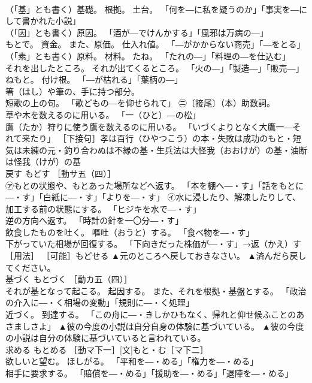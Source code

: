 \documentclass[8pt]{extreport}
\begin{document}
\begin{CJK}{UTF8}{min}
\\	（「基」とも書く）基礎。 根拠。 土台。 「何を―に私を疑うのか」「事実を―にして書かれた小説」 
\\	（「因」とも書く）原因。 「酒が―でけんかする」「風邪は万病の―」 
\\	もとで。 資金。 また、原価。 仕入れ値。 「―がかからない商売」「―をとる」 
\\	（「素」とも書く）原料。 材料。 たね。 「たれの―」「料理の―を仕込む」 
\\	それを出したところ。 それが出てくるところ。 「火の―」「製造―」「販売―」 
\\	ねもと。 付け根。 「―が枯れる」「葉柄の―」 
\\	箸（はし）や筆の、手に持つ部分。 
\\	短歌の上の句。 「歌どもの―を仰せられて」 ㊁〔接尾〕（本）助数詞。 
\\	草や木を数えるのに用いる。 「一（ひと）―の松」 
\\	鷹（たか）狩りに使う鷹を数えるのに用いる。 「いづくよりとなく大鷹一―それて来たり」 ［下接句］孝は百行（ひやつこう）の本・失敗は成功のもと・短気は未練の元・釣り合わぬは不縁の基・生兵法は大怪我（おおけが）の基・油断は怪我（けが）の基	
\\	戻す	もどす	［動サ五（四）］ 
\\	㋐もとの状態や、もとあった場所などへ返す。 「本を棚へ―・す」「話をもとに―・す」「白紙に―・す」「よりを―・す」 ㋑水に浸したり、解凍したりして、加工する前の状態にする。 「ヒジキを水で―・す」 
\\	逆の方向へ返す。 「時計の針を一〇分―・す」 
\\	飲食したものを吐く。 嘔吐（おうと）する。 「食べ物を―・す」 
\\	下がっていた相場が回復する。 「下向きだった株価が―・す」→返（かえ）す［用法］ ［可能］もどせる	▲元のところへ戻しておきなさい。 ▲済んだら戻してください。
\\	基づく	もとづく	［動カ五（四）］ 
\\	それが基となって起こる。 起因する。 また、それを根拠・基盤とする。 「政治の介入に―・く相場の変動」「規則に―・く処理」 
\\	近づく。 到達する。 「この舟に―・きしかひもなく、帰れと仰せ候ふことのあさましさよ」	▲彼の今度の小説は自分自身の体験に基づいている。 ▲彼の今度の小説は自分の体験に基づいていると言われている。
\\	求める	もとめる	［動マ下一］[文]もと・む［マ下二］ 
\\	欲しいと望む。 ほしがる。 「平和を―・める」「権力を―・める」 
\\	相手に要求する。 「賠償を―・める」「援助を―・める」「退陣を―・める」 

\end{CJK}
\end{document}
